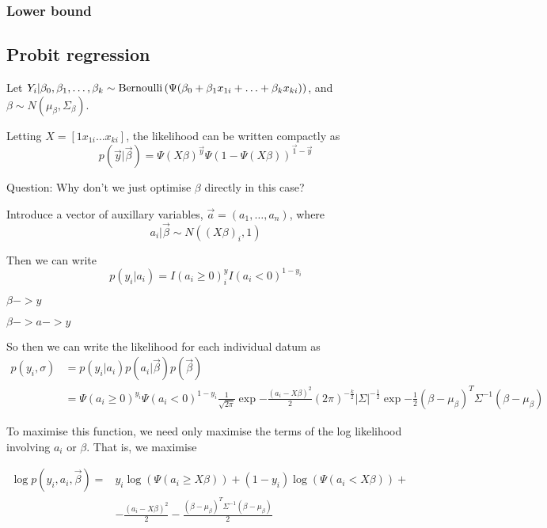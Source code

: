 \documentclass{amsart}
\begin{document}
\subsubsection{Lower bound}

\subsection{Probit regression}
Let $Y_i|\beta_0, \beta_1, \ldots, \beta_k \sim \text{Bernoulli} \left( \Psi(\beta_0 + \beta_1 x_{1i} + \ldots + \beta_k x_{ki}) \right)$, and $\beta \sim N(\mu_\beta, \Sigma_\beta)$.

Letting $X = [1 x_{1i} \ldots x_{ki}]$, the likelihood can be written compactly as
\[
p(\vec{y}|\vec{\beta}) = \Psi(X \beta)^{\vec{y}} \Psi(1 - \Psi(X \beta))^{\vec{1} - \vec{y}}
\]

Question: Why don't we just optimise $\beta$ directly in this case?

Introduce a vector of auxillary variables, $\vec{a} = (a_1, \ldots, a_n)$, where
\[
a_i | \vec{\beta} \sim N((X\beta)_i, 1)
\]

Then we can write
\[
p(y_i|a_i) = I(a_i \geq 0)^y_i I(a_i < 0)^{1-y_i}
\]

$\beta -> y$

$\beta -> a -> y$

So then we can write the likelihood for each individual datum as
\begin{align*}
	p(y_i, \sigma) &= p(y_i|a_i) p(a_i|\vec{\beta}) p(\vec{\beta}) \\
	&= \Psi(a_i \geq 0)^{y_i} \Psi(a_i < 0)^{1 - y_i} \frac{1}{\sqrt{2 \pi}} \exp{- \frac{(a_i - X \beta)^2}{2}} \left( 2 \pi \right)^{-\frac{k}{2}} |\Sigma|^{-\frac{1}{2}} \exp{-\frac{1}{2} (\beta - \mu_\beta)^T \Sigma^{-1} (\beta - \mu_\beta)}
\end{align*}

To maximise this function, we need only maximise the terms of the log likelihood
involving $a_i$ or $\beta$. That is, we maximise

\begin{align*}
\log{p(y_i, a_i, \vec{\beta})} =& y_i \log{(\Psi(a_i \geq X \beta))} + (1 - y_i) \log{(\Psi(a_i < X \beta))} + \\
&- \frac{(a_i - X \beta)^2}{2} - \frac{(\beta - \mu_\beta)^T \Sigma^{-1} (\beta - \mu_\beta)}{2}
\end{align*}
\end{document}

